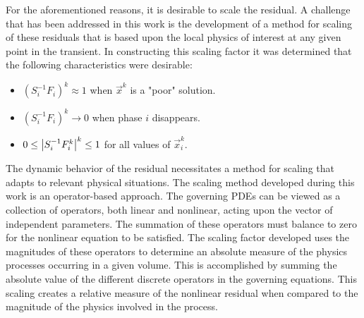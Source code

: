For the aforementioned reasons, it is desirable to scale the residual.
A challenge that has been addressed in this work is the development of a method for scaling of these residuals that is based upon the local physics of interest at any given point in the transient.
In constructing this scaling factor it was determined that the following characteristics were desirable:

\begin{itemize}
\item{$(S_{i}^{-1} F_i)^{k} \approx 1$ when $\vec{x}^{k}$ is a "poor" solution.}
\item{$(S_{i}^{-1} F_i)^{k} \rightarrow 0$ when phase $i$ disappears.}
\item{$0 \leq \left|S_{i}^{-1} F^{k}_{i}\right|^{k} \leq 1 $ for all values of $\vec{x}^{k}_i$.}
\end{itemize}

The dynamic behavior of the residual necessitates a method for scaling that adapts to relevant physical situations.
The scaling method developed during this work is an operator-based approach.
The governing PDEs can be viewed as a collection of operators, both linear and nonlinear, acting upon the vector of independent parameters.
The summation of these operators must balance to zero for the nonlinear equation to be satisfied.
The scaling factor developed uses the magnitudes of these operators to determine an absolute measure of the physics processes occurring in a given volume.
This is accomplished by summing the absolute value of the different discrete operators in the governing equations.
This scaling creates a relative measure of the nonlinear residual when compared to the magnitude of the physics involved in the process.

